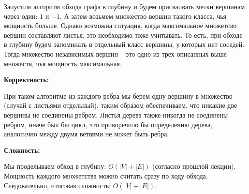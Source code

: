 \documentclass[12pt]{extreport}
\begin{document}
Запустим алгоритм обхода графа в глубину и будем присваивать метки вершинам через один: $1$ и $-1$. А затем возьмем множество вершин такого класса, чья мощность больше. Однако возможна ситуация, когда максимальное множетсво вершин составляют листья, это необходимо тоже учитывать. То есть, при обходе в глубину будем запоминать в отдельный класс вершины, у которых нет соседей. Тогда множество независимых вершин -- это одно из трех описанных выше множеств, чья мощность максимальная.

\bigskip 
{\bf Корректность:}

При таком алгоритме из каждого ребра мы берем одну вершину в множество (случай с листьями отдельный), таким образом обеспечиваем, что никакие две вершины не соединены ребром. Листья дерева также никогда не соединены ребром, иначе был бы цикл, что приворечило бы определению дерева, аналогично между двумя ветвями не может быть ребра. 

\bigskip 
{\bf Сложность:} 

Мы проделываем обход в глубину: $O(|V|+|E|)$ (согласно прошлой лекции). Мощность каждого множетства можно считать сразу по ходу обхода. Следовательно, итоговая сложность: $O(|V|+|E|)$.
\end{document}
